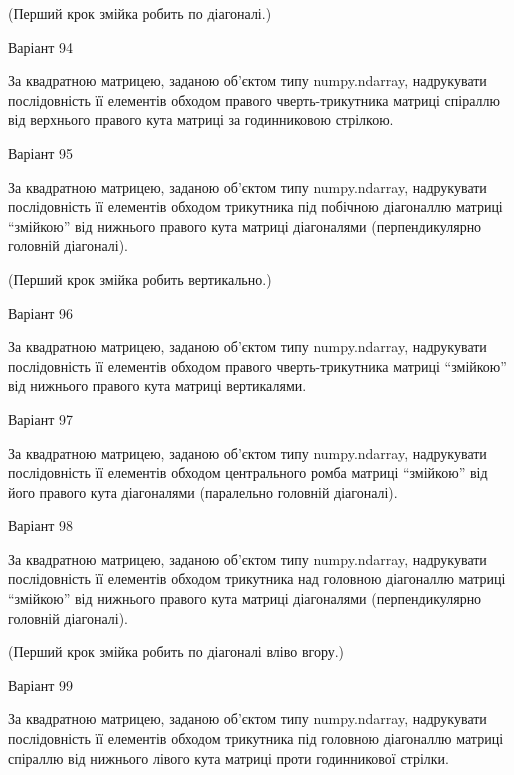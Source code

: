 \documentclass[11pt, ukrainian]{article}
\begin{document}
(Перший крок змійка робить по діагоналі.)


{\Large \center  Варіант  94\par \bigskip\bigskip}

За квадратною матрицею, заданою об'єктом типу numpy.ndarray, надрукувати послідовність її елементів обходом правого чверть-трикутника матриці спіраллю від верхнього правого кута матриці за годинниковою стрілкою.





{\Large \center  Варіант  95\par \bigskip\bigskip}

За квадратною матрицею, заданою об'єктом типу numpy.ndarray, надрукувати послідовність її елементів обходом трикутника під побічною діагоналлю матриці ``змійкою'' від нижнього правого кута матриці діагоналями (перпендикулярно головній діагоналі).


(Перший крок змійка робить вертикально.)



{\Large \center  Варіант  96\par \bigskip\bigskip}

За квадратною матрицею, заданою об'єктом типу numpy.ndarray, надрукувати послідовність її елементів обходом правого чверть-трикутника матриці ``змійкою'' від нижнього правого кута матриці вертикалями.





{\Large \center  Варіант  97\par \bigskip\bigskip}

За квадратною матрицею, заданою об'єктом типу numpy.ndarray, надрукувати послідовність її елементів обходом центрального ромба матриці ``змійкою'' від його правого кута діагоналями (паралельно головній діагоналі).





{\Large \center  Варіант  98\par \bigskip\bigskip}

За квадратною матрицею, заданою об'єктом типу numpy.ndarray, надрукувати послідовність її елементів обходом трикутника над головною діагоналлю матриці ``змійкою'' від нижнього правого кута матриці діагоналями (перпендикулярно головній діагоналі).


(Перший крок змійка робить по діагоналі вліво вгору.)


{\Large \center  Варіант  99\par \bigskip\bigskip}

За квадратною матрицею, заданою об'єктом типу numpy.ndarray, надрукувати послідовність її елементів обходом трикутника під головною діагоналлю матриці спіраллю від нижнього лівого кута матриці проти годинникової стрілки.





\end{document}
